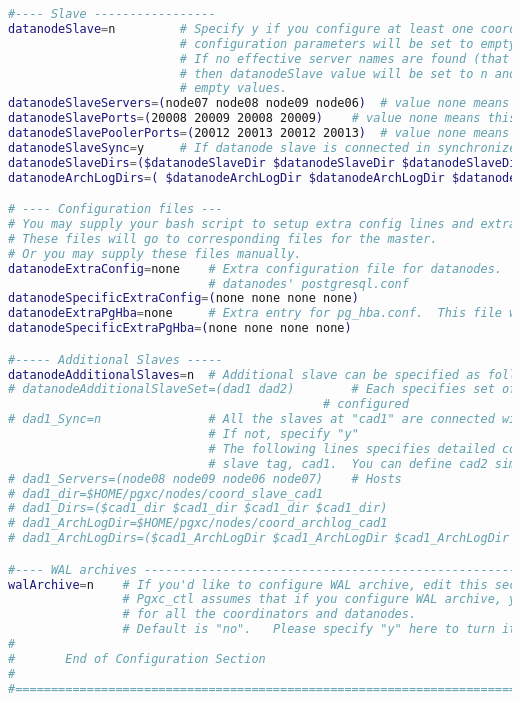 \begin{lstlisting}[language=bash,caption={Konfigurationsdatei pgxc-ctl}]
#---- Slave -----------------
datanodeSlave=n			# Specify y if you configure at least one coordiantor slave.  Otherwise, the following
						# configuration parameters will be set to empty values.
						# If no effective server names are found (that is, every servers are specified as none),
						# then datanodeSlave value will be set to n and all the following values will be set to
						# empty values.
datanodeSlaveServers=(node07 node08 node09 node06)	# value none means this slave is not available
datanodeSlavePorts=(20008 20009 20008 20009)	# value none means this slave is not available
datanodeSlavePoolerPorts=(20012 20013 20012 20013)	# value none means this slave is not available
datanodeSlaveSync=y		# If datanode slave is connected in synchronized mode
datanodeSlaveDirs=($datanodeSlaveDir $datanodeSlaveDir $datanodeSlaveDir $datanodeSlaveDir)
datanodeArchLogDirs=( $datanodeArchLogDir $datanodeArchLogDir $datanodeArchLogDir $datanodeArchLogDir )

# ---- Configuration files ---
# You may supply your bash script to setup extra config lines and extra pg_hba.conf entries here.
# These files will go to corresponding files for the master.
# Or you may supply these files manually.
datanodeExtraConfig=none	# Extra configuration file for datanodes.  This file will be added to all the 
							# datanodes' postgresql.conf
datanodeSpecificExtraConfig=(none none none none)
datanodeExtraPgHba=none		# Extra entry for pg_hba.conf.  This file will be added to all the datanodes' postgresql.conf
datanodeSpecificExtraPgHba=(none none none none)

#----- Additional Slaves -----
datanodeAdditionalSlaves=n	# Additional slave can be specified as follows: where you
# datanodeAdditionalSlaveSet=(dad1 dad2)		# Each specifies set of slaves.   This case, two set of slaves are
											# configured
# dad1_Sync=n		  		# All the slaves at "cad1" are connected with asynchronous mode.
							# If not, specify "y"
							# The following lines specifies detailed configuration for each
							# slave tag, cad1.  You can define cad2 similarly.
# dad1_Servers=(node08 node09 node06 node07)	# Hosts
# dad1_dir=$HOME/pgxc/nodes/coord_slave_cad1
# dad1_Dirs=($cad1_dir $cad1_dir $cad1_dir $cad1_dir)
# dad1_ArchLogDir=$HOME/pgxc/nodes/coord_archlog_cad1
# dad1_ArchLogDirs=($cad1_ArchLogDir $cad1_ArchLogDir $cad1_ArchLogDir $cad1_ArchLogDir)

#---- WAL archives -------------------------------------------------------------------------------------------------
walArchive=n	# If you'd like to configure WAL archive, edit this section.
				# Pgxc_ctl assumes that if you configure WAL archive, you configure it
				# for all the coordinators and datanodes.
				# Default is "no".   Please specify "y" here to turn it on.
#
#		End of Configuration Section
#
#==========================================================================================================================


\end{lstlisting}
